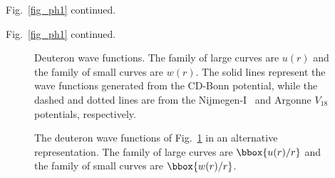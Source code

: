 \vspace*{-3.0cm}
\hspace*{-1.7cm}
\vspace*{-3.0cm}
\begin{center}
Fig.~\ref{fig_ph1} continued.
\end{center}



\pagebreak

\vspace*{-3.0cm}
\hspace*{-1.7cm}
\vspace*{-9.0cm}
\begin{center}
Fig.~\ref{fig_ph1} continued.
\end{center}


\pagebreak


\begin{figure}
\vspace*{-2cm}
\hspace*{2.0cm}
\vspace*{-3.0cm}
\caption{Deuteron wave functions.
The family of large curves are $u(r)$ and the family of
small curves are $w(r)$. The solid lines represent the
wave functions generated from the CD-Bonn potential, while
the dashed and dotted lines are from the Nijmegen-I~\protect\cite{Sto94} and
Argonne $V_{18}$~\protect\cite{WSS95} potentials, respectively.}
\label{fig_dwaves}
\end{figure}


\begin{figure}
\vspace*{-2cm}
\hspace*{2.0cm}
\vspace*{-3.0cm}
\caption{The deuteron wave functions of Fig.~\protect\ref{fig_dwaves}
in an alternative representation.
The family of large curves are $\bbox{u(r)/r}$ and the family of
small curves are $\bbox{w(r)/r}$.}
\label{fig_dwaves2}
\end{figure}


